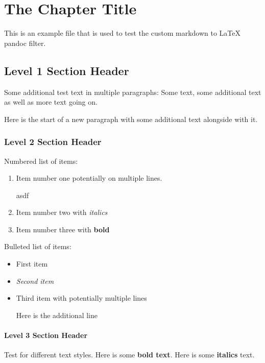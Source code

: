 \chapter[\DTMusedate{entry}]{The Chapter Title}

This is an example file that is used to test the custom markdown to
LaTeX pandoc filter.

\section{Level 1 Section Header}

Some additional test text in multiple paragraphs: Some text, some
additional text as well as more text going on.

Here is the start of a new paragraph with some additional text alongside
with it.

\subsection{Level 2 Section Header}

Numbered list of items:

\begin{enumerate}
    \item Item number one potentially on multiple lines.

asdf

    \item Item number two with \emph{italics}

    \item Item number three with \textbf{bold}

\end{enumerate}

Bulleted list of items:

\begin{itemize}
\item
  First item
\item
  \emph{Second item}
\item
  Third item with potentially multiple lines

  Here is the additional line
\end{itemize}

\subsubsection{Level 3 Section Header}

Test for different text styles. Here is some \textbf{bold text}. Here is
some \textbf{italics} text.

